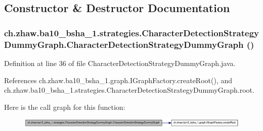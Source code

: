 \subsection{Constructor \& Destructor Documentation}
\hypertarget{classch_1_1zhaw_1_1ba10__bsha__1_1_1strategies_1_1CharacterDetectionStrategyDummyGraph_ac895001a14e7fe390464f49a94ddd340}{
\subsubsection[{CharacterDetectionStrategyDummyGraph}]{\setlength{\rightskip}{0pt plus 5cm}ch.zhaw.ba10\_\-bsha\_\-1.strategies.CharacterDetectionStrategyDummyGraph.CharacterDetectionStrategyDummyGraph ()}}
\label{classch_1_1zhaw_1_1ba10__bsha__1_1_1strategies_1_1CharacterDetectionStrategyDummyGraph_ac895001a14e7fe390464f49a94ddd340}


Definition at line 36 of file CharacterDetectionStrategyDummyGraph.java.

References ch.zhaw.ba10\_\-bsha\_\-1.graph.IGraphFactory.createRoot(), and ch.zhaw.ba10\_\-bsha\_\-1.strategies.CharacterDetectionStrategyDummyGraph.root.

Here is the call graph for this function:\nopagebreak
\begin{figure}[H]
\begin{center}
\leavevmode
\includegraphics[width=420pt]{classch_1_1zhaw_1_1ba10__bsha__1_1_1strategies_1_1CharacterDetectionStrategyDummyGraph_ac895001a14e7fe390464f49a94ddd340_cgraph}
\end{center}
\end{figure}


